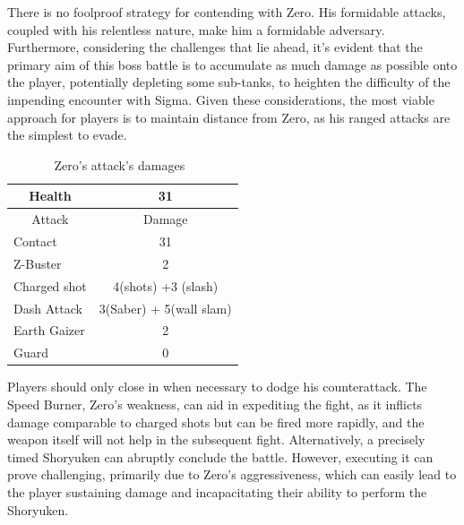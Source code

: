 There is no foolproof strategy for contending with Zero. His formidable attacks, coupled with his relentless nature, make him a formidable adversary. Furthermore, considering the challenges that lie ahead, it's evident that the primary aim of this boss battle is to accumulate as much damage as possible onto the player, potentially depleting some sub-tanks, to heighten the difficulty of the impending encounter with Sigma. Given these considerations, the most viable approach for players is to maintain distance from Zero, as his ranged attacks are the simplest to evade.
\begin{table}[htp]
	\centering
	\begin{tabular}[h]{l c}
		\toprule
		\multicolumn{1}{c}{Health}  & 31 \\
		\midrule
		\multicolumn{1}{c}{Attack} & \multicolumn{1}{c}{Damage}\\
		Contact & 31\\
		Z-Buster & 2\\
		Charged shot&4(shots) +3 (slash) \\
		Dash Attack & 3(Saber) + 5(wall slam)\\
		Earth Gaizer & 2\\
		Guard & 0\\
		\bottomrule
	\end{tabular}
	\caption{Zero's attack's damages~\cite{wiki:Zero_X2}}
\end{table}
 Players should only close in when necessary to dodge his counterattack. The Speed Burner, Zero's weakness, can aid in expediting the fight, as it inflicts  damage comparable to charged shots but can be fired more rapidly, and the weapon itself will not help in the subsequent fight. Alternatively, a precisely timed Shoryuken can abruptly conclude the battle. However, executing it can prove challenging, primarily due to Zero's aggressiveness, which can easily lead to the player sustaining damage and incapacitating their ability to perform the Shoryuken.



